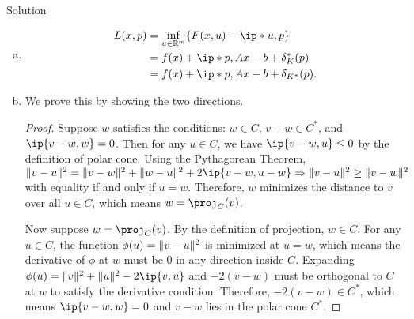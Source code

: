 \documentclass{article}
\begin{document}
\begin{solution}
    {Solution}
    \begin{enumerate}[(a)]
        \item {
            \begin{align*}
                L(x, p)
                &= \inf_{u\in\R^m} \braces*{F(x,u)-\ip*{u,p}} \\
                &= f(x)+\ip*{p, Ax-b}+\delta_K^*(p) \\
                &= f(x)+\ip*{p, Ax-b}+\delta_{K^*}(p).
            \end{align*}
        }
        \item {We prove this by showing the two directions.
            \begin{proof}
                Suppose $w$ satisfies the conditions: $w\in C$, $v-w\in C^*$, and $\ip{v-w, w}=0$. Then for any $u\in C$, we have $\ip{v-w, u}\leq 0$ by the definition of polar cone. Using the Pythagorean Theorem, $\norm{v-u}^2=\norm{v-w}^2+\norm{w-u}^2+2\ip{v-w, u-w}\Rightarrow\norm{v-u}^2\geq\norm{v-w}^2$ with equality if and only if $u=w$. Therefore, $w$ minimizes the distance to $v$ over all $u\in C$, which means $w=\proj_C(v)$.

                Now suppose $w=\proj_C(v)$. By the definition of projection, $w\in C$. For any $u\in C$, the function $\phi(u)=\lVert v-u\rVert^2$ is minimized at $u=w$, which means the derivative of $\phi$ at $w$ must be $0$ in any direction inside $C$. Expanding $\phi(u)=\norm{v}^2+\norm{u}^2-2\ip{v, u}$ and $-2(v-w)$ must be orthogonal to $C$ at $w$ to satisfy the derivative condition. Therefore, $-2(v-w)\in C^*$, which means $\ip{v-w, w}=0$ and $v-w$ lies in the polar cone $C^*$.


\end{proof}}
\end{enumerate}
\end{solution}
\end{document}
